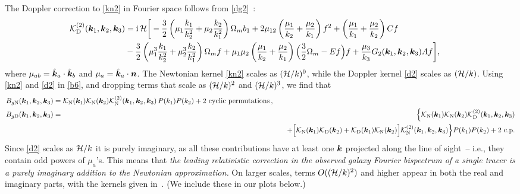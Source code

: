 The Doppler correction to \eqref{kn2} in Fourier space follows from \eqref{dg2}~\citep{Jolicoeur:2017eyi}:
\begin{align}
\mathcal{K}^{(2)}_{\mathrm{D}}(\bm{k}_{1}, \bm{k}_{2}, \bm{k}_{3}) &= {\mathrm{i\,}} {\mathcal{H}}
\bigg[ - \frac{3}{2} \left( \mu_{1} \frac{k_{1}}{k_2^2} + \mu_{2} \frac{k_{2}}{k_1^2} \right) \Omega_m b_1 + 2\mu_{12} \left( \frac{\mu_{1}}{k_2} + \frac{\mu_{2}}{k_1}\right) f^2  + \left( \frac{\mu_{1}}{k_1} + \frac{\mu_{2}}{k_2} \right){C} f  
\nonumber \\
& - \frac{3}{2} \left( \mu_{1}^3 \frac{k_{1}}{k_2^2} + \mu_{2}^3 \frac{k_{2}}{k_1^2} \right)\Omega_m f 
 + \mu_{1}\mu_{2}\left( \frac{\mu_{1}}{k_2} + \frac{\mu_{2}}{k_1} \right) {\Big( \frac{3}{2} \Omega_m - E f\Big) f} + \frac{\mu_{3}}{k_{3}} G_{2}(\bm{k}_{1}, \bm{k}_{2},\bm {k}_3){A} f\bigg] ,~~~~  \label{d2}
\end{align}
where $\mu_{ab}=\hat{\bm {k}}_a\cdot \hat{\bm {k}}_b$ and $\mu_a=\hat{\bm {k}}_a\cdot\bm n$. 
 The Newtonian kernel \eqref{kn2} scales as $(\mathcal{H}/k)^{0}$, while the Doppler kernel \eqref{d2} scales as $(\mathcal{H}/k)$. 
Using \eqref{kn2} and \eqref{d2} in \eqref{b6}, and dropping terms that scale as $(\mathcal{H}/k)^{2}$ and $(\mathcal{H}/k)^{3}$,
we find that
\begin{align}
B_{g{\mathrm{N}}}( \bm{k}_{1},  \bm{k}_{2},  \bm {k}_3) &=  \mathcal{K}_{\mathrm{N}}(\bm {k}_1)\mathcal{K}_{\mathrm{N}}(\bm {k}_2)\mathcal{K}^{(2)}_{\mathrm{N}}(\bm {k}_1,\bm {k}_2,\bm {k}_3)\,P(k_{1})P(k_{2})  +\text{2 cyclic permutations} \,,\\
B_{g{\mathrm{D}}}( \bm{k}_{1},  \bm{k}_{2},  \bm {k}_3) &=& \Big\{
\mathcal{K}_{\mathrm{N}}(\bm {k}_1)\mathcal{K}_{\mathrm{N}}(\bm {k}_2)\mathcal{K}^{(2)}_{\mathrm{D}}(\bm {k}_1,\bm {k}_2,\bm {k}_3)
\nonumber\\ \label{bd}
&&~~~ 
+\Big[ \mathcal{K}_{\mathrm{N}}(\bm {k}_1)\mathcal{K}_{\mathrm{D}}(\bm {k}_2)+\mathcal{K}_{\mathrm{D}}(\bm {k}_1)\mathcal{K}_{\mathrm{N}}(\bm {k}_2) \Big]\mathcal{K}^{(2)}_{\mathrm{N}}(\bm {k}_1,\bm {k}_2,\bm {k}_3)
\Big\}
P(k_{1})P(k_{2}) +\text{2 c.p.}
\end{align}
Since \eqref{d2} scales as $\mathcal{H}/k$ it is purely imaginary, as all these contributions have at least one $\bm {k}$ projected along the line of sight~-- i.e.,  they contain odd powers of $\mu_a$'s. This means that {\em the leading relativistic correction in the observed galaxy Fourier bispectrum of a single tracer is a purely imaginary addition to the Newtonian approximation.} On larger scales, terms $O((\mathcal{H}/k)^{2})$ and higher appear in both the real and imaginary parts, with the kernels given in~\citet{Umeh:2016nuh,Jolicoeur:2017nyt,Jolicoeur:2017eyi,Jolicoeur:2018blf}. (We include these in our plots below.)


